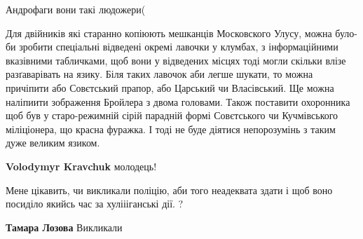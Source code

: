 \begin{itemize}
Андрофаги вони такі людожери(

 

Для двійників які старанно копіюють мешканців Московского Улусу, можна було-би
зробити спеціальні відведені окремі лавочки у клумбах, з інформаційними
вказівними табличками, щоб вони у відведених місцях тоді могли скільки влізе
разґаварівать на язику. Біля таких лавочок аби легше шукати, то можна причіпити
або Совєтський прапор, або Царський чи Власівський. Ще можна наліпиити
зображення Бройлера з двома головами. Також поставити охоронника щоб був у
старо-режимній сірій парадній формі Совєтського чи Кучмівського міліціонера, що
красна фуражка. І тоді не буде діятися непорозумінь з таким дуже великим
язиком. \Smiley[1.0][yellow]


 
\textbf{Volodymyr Kravchuk} молодець!

 

Мене цікавить, чи викликали поліцію, аби того неадеквата здати і щоб воно
посиділо якийсь час за хуліііганські дії. ?

\begin{itemize}
 
\textbf{Тамара Лозова} Викликали

 

\end{itemize}
\end{itemize}
